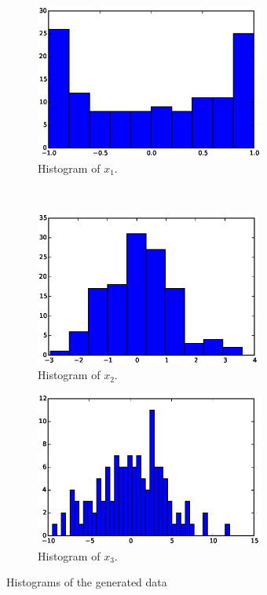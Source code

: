 \documentclass[a4paper,12pt]{article}
\begin{document}
\begin{figure}[t!]
    \centering
    \begin{subfigure}[t]{0.5\textwidth} 
        \centering
        \includegraphics[height=2in]{figures/e2_hist_x1.eps}
        \caption{Histogram of $x_1$.}
        \label{fig:e21}
    \end{subfigure}%
    ~  %
    \begin{subfigure}[t]{0.5\textwidth}
        \centering
        \includegraphics[height=2in]{figures/e2_hist_x2.eps}
        \caption{Histogram of $x_2$.}
        \label{fig:e22}
    \end{subfigure}%
     
    \begin{subfigure}[t]{0.5\textwidth}
        \centering
        \includegraphics[height=2in]{figures/e2_hist_x3.eps}
        \caption{Histogram of $x_3$.}
        \label{fig:e23}
    \end{subfigure}    
    \caption{Histograms of the generated data}
    \label{fig:hist}
\end{figure}
\end{document}
